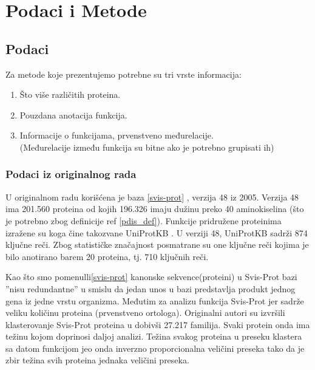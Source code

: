 
\chapter{Podaci i Metode} %

\label{Podaci i Metode} %



\section {Podaci}

Za metode koje prezentujemo potrebne su tri vrste informacija:
\begin{enumerate}
  \item Što više različitih proteina.
  \item Pouzdana anotacija funkcija.
  \item Informacije o funkcijama, prvenstveno međurelacije.\\
    (Međurelacije između funkcija su bitne  ako je potrebno grupisati ih)
\end{enumerate}


\subsection{Podaci iz originalnog rada}

U originalnom radu \parencite{Xie2007} korišćena je  baza 
\ref{svis-prot} , verzija 48 iz 2005.
Verzija 48 ima 201.560 proteina od kojih 196.326 imaju dužinu preko 40
aminokiselina (što je potrebno zbog definicije ref \ref{pdis_def}). Funkcije
pridružene proteinima izražene su 
 koga čine takozvane UniProtKB 
. U verziji 48, UniProtKB sadrži 874 ključne reči.  Zbog
statističke značajnost posmatrane su one ključne reči kojima je bilo anotirano
barem 20 proteina, tj. 710 ključnih reči.

Kao što smo pomenulli\ref{svis-prot} kanonske sekvence(proteini) u Svis-Prot
bazi ''nisu redundantne'' u smislu da jedan unos u bazi predstavlja produkt
jednog gena iz jedne vrstu organizma. Međutim za analizu funkcija
Svis-Prot \parencite{proveriti} jer
sadrže veliku količinu  proteina (prvenstveno ortologa).
Originalni autori \parencite{Xie2007} su izvršili klasterovanje Svis-Prot
proteina u  dobivši 27.217 familija. Svaki protein
onda ima težinu kojom doprinosi daljoj analizi. Težina svakog proteina u preseku
klastera sa datom funkcijom jeo onda inverzno proporcionalna veličini preseka
tako da je zbir težina svih proteina jednaka veličini preseka.

